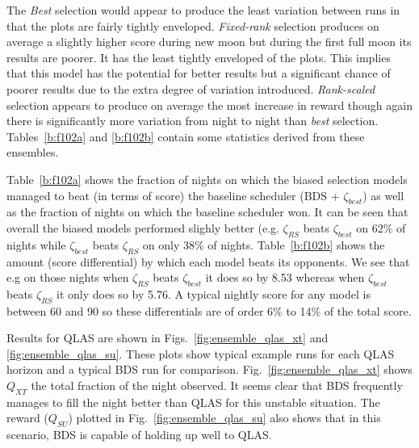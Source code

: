 The \emph{Best} selection would appear to produce the least variation between runs in that the plots are fairly tightly enveloped. \emph{Fixed-rank} selection produces on average a slightly higher score during new moon but during the first full moon its results are poorer. It has the least tightly enveloped of the plots. This implies that this model has the potential for better results but a significant chance of poorer results due to the extra degree of variation introduced. \emph{Rank-scaled} selection appears to produce on average the most increase in reward though again there is significantly more variation from night to night than \emph{best} selection. Tables~\ref{b:f102a} and \ref{b:f102b} contain some statistics derived from these ensembles. 

Table~\ref{b:f102a} shows the fraction of nights on which the biased selection models managed to beat (in terms of score) the baseline scheduler (BDS + $\zeta_{best}$) as well as the fraction of nights on which the baseline scheduler won. It can be seen that overall the biased models performed slighly better (e.g. $\zeta_{RS}$ beats $\zeta_{best}$ on 62\% of nights while $\zeta_{best}$ beats $\zeta_{RS}$ on only 38\% of nights. Table~\ref{b:f102b} shows the amount (score differential) by which each model beats its opponents. We see that e.g on those nights when $\zeta_{RS}$ beats $\zeta_{best}$ it does so by 8.53 whereas when $\zeta_{best}$ beats $\zeta_{RS}$ it only does so by 5.76. A typical nightly score for any model is between 60 and 90 so these differentials are of order 6\% to 14\% of the total score.



Results for QLAS are shown in Figs.~\ref{fig:ensemble_qlas_xt} and \ref{fig:ensemble_qlas_su}. These plots show typical example runs for each QLAS horizon and a typical BDS run for comparison. Fig.~\ref{fig:ensemble_qlas_xt} shows $Q_{XT}$ the total fraction of the night observed. It seems clear that BDS frequently manages to fill the night better than QLAS for this unstable situation. The reward ($Q_{SU}$) plotted in Fig.~\ref{fig:ensemble_qlas_su} also shows that in this scenario, BDS is capable of holding up well to QLAS.

